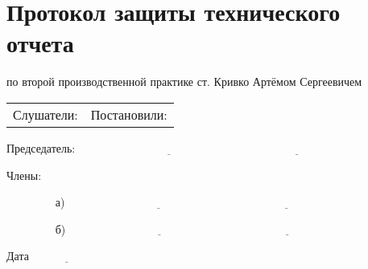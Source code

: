 \newpage
\section{Протокол защиты технического отчета}

по второй производственной практике ст. Кривко Артёмом Сергеевичем

\begin{center}
	\begin{table}[h]
		\begin{tabular}{p{6cm}p{6cm}}

			Слушатели: & Постановили:

		\end{tabular}
	\end{table}
\end{center}

\vspace{20em}

Председатель: $\underline{\qquad\qquad\qquad\qquad\qquad\qquad\qquad\qquad}$  $\underline{\qquad\qquad\qquad}$

Члены: 

$\quad\quad\quad\quad$ а)	 $\underline{\qquad\qquad\qquad\qquad\qquad\qquad\qquad\qquad}$  $\underline{\qquad\qquad\qquad}$

$\quad\quad\quad\quad$ б)    $\underline{\qquad\qquad\qquad\qquad\qquad\qquad\qquad\qquad}$  $\underline{\qquad\qquad\qquad}$

\vspace{1em}

\begin{flushright}
	Дата $\underline{\qquad\qquad\qquad}$	
\end{flushright}